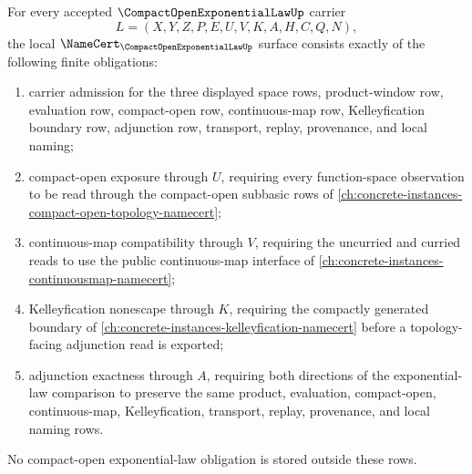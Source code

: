 \begin{theorem}
\label{thm:compact-open-exponential-law-namecert-obligations}
For every accepted $\CompactOpenExponentialLawUp$ carrier
$$
L=(X,Y,Z,P,E,U,V,K,A,H,C,Q,N),
$$
the local $\NameCert_{\CompactOpenExponentialLawUp}$ surface consists exactly of the following finite obligations:
\begin{enumerate}
\item carrier admission for the three displayed space rows, product-window row, evaluation row, compact-open row, continuous-map row, Kelleyfication boundary row, adjunction row, transport, replay, provenance, and local naming;
\item compact-open exposure through $U$, requiring every function-space observation to be read through the compact-open subbasic rows of \autoref{ch:concrete-instances-compact-open-topology-namecert};
\item continuous-map compatibility through $V$, requiring the uncurried and curried reads to use the public continuous-map interface of \autoref{ch:concrete-instances-continuousmap-namecert};
\item Kelleyfication nonescape through $K$, requiring the compactly generated boundary of \autoref{ch:concrete-instances-kelleyfication-namecert} before a topology-facing adjunction read is exported;
\item adjunction exactness through $A$, requiring both directions of the exponential-law comparison to preserve the same product, evaluation, compact-open, continuous-map, Kelleyfication, transport, replay, provenance, and local naming rows.
\end{enumerate}
No compact-open exponential-law obligation is stored outside these rows.
\end{theorem}
